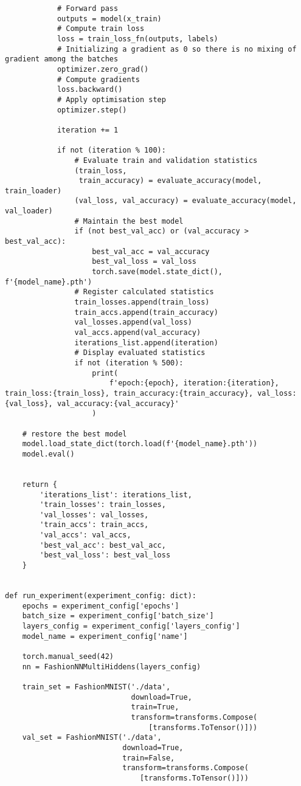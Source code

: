 \begin{verbatim}
            # Forward pass
            outputs = model(x_train)
            # Compute train loss
            loss = train_loss_fn(outputs, labels)
            # Initializing a gradient as 0 so there is no mixing of gradient among the batches
            optimizer.zero_grad()
            # Compute gradients
            loss.backward()
            # Apply optimisation step
            optimizer.step()

            iteration += 1

            if not (iteration % 100):
                # Evaluate train and validation statistics
                (train_loss,
                 train_accuracy) = evaluate_accuracy(model, train_loader)
                (val_loss, val_accuracy) = evaluate_accuracy(model, val_loader)
                # Maintain the best model
                if (not best_val_acc) or (val_accuracy > best_val_acc):
                    best_val_acc = val_accuracy
                    best_val_loss = val_loss
                    torch.save(model.state_dict(), f'{model_name}.pth')
                # Register calculated statistics
                train_losses.append(train_loss)
                train_accs.append(train_accuracy)
                val_losses.append(val_loss)
                val_accs.append(val_accuracy)
                iterations_list.append(iteration)
                # Display evaluated statistics
                if not (iteration % 500):
                    print(
                        f'epoch:{epoch}, iteration:{iteration}, train_loss:{train_loss}, train_accuracy:{train_accuracy}, val_loss:{val_loss}, val_accuracy:{val_accuracy}'
                    )

    # restore the best model
    model.load_state_dict(torch.load(f'{model_name}.pth'))
    model.eval()


    return {
        'iterations_list': iterations_list,
        'train_losses': train_losses,
        'val_losses': val_losses,
        'train_accs': train_accs,
        'val_accs': val_accs,
        'best_val_acc': best_val_acc,
        'best_val_loss': best_val_loss
    }


def run_experiment(experiment_config: dict):
    epochs = experiment_config['epochs']
    batch_size = experiment_config['batch_size']
    layers_config = experiment_config['layers_config']
    model_name = experiment_config['name']

    torch.manual_seed(42)
    nn = FashionNNMultiHiddens(layers_config)

    train_set = FashionMNIST('./data',
                             download=True,
                             train=True,
                             transform=transforms.Compose(
                                 [transforms.ToTensor()]))
    val_set = FashionMNIST('./data',
                           download=True,
                           train=False,
                           transform=transforms.Compose(
                               [transforms.ToTensor()]))


\end{verbatim}
